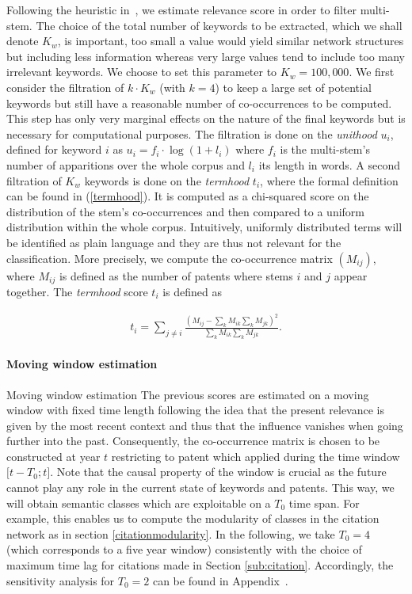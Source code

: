 Following the heuristic in~\cite{chavalarias2013phylomemetic}, we estimate relevance score in order to filter multi-stem. The choice of the total number of keywords to be extracted, which we shall denote $K_w$, is important, too small a value would yield similar network structures but including less information whereas very large values tend to include too many irrelevant keywords. We choose to set this parameter to $K_w = 100,000$. We first consider the filtration of $k\cdot K_w$ (with $k=4$) to keep a large set of potential keywords but still have a reasonable number of co-occurrences to be computed. This step has only very marginal effects on the nature of the final keywords but is necessary for computational purposes. The filtration is done on the \emph{unithood} $u_i$, defined for keyword $i$ as $u_i = f_i\cdot \log{(1 + l_i)}$ where $f_i$ is the multi-stem's number of apparitions over the whole corpus and $l_i$ its length in words. A second filtration of $K_w$ keywords is done on the \emph{termhood} $t_i$, where the formal definition can be found in (\ref{termhood}). It is computed as a chi-squared score on the distribution of the stem's co-occurrences and then compared to a uniform distribution within the whole corpus. Intuitively, uniformly distributed terms will be identified as plain language and they are thus not relevant for the classification. More precisely, we compute the co-occurrence matrix $(M_{ij})$, where $M_{ij}$ is defined as the number of patents where stems $i$ and $j$ appear together. The \emph{termhood} score $t_i$ is defined as

\begin{eqnarray}
\label{termhood}
t_i = \sum_{j\neq i}\frac{\left( M_{ij} - \sum_{k}M_{ik} \sum_{k} M_{jk}\right)^2}{\sum_{k}M_{ik} \sum_{k} M_{jk}}.
\end{eqnarray}

\paragraph{Moving window estimation}{Moving window estimation}
The previous scores are estimated on a moving window with fixed time length following the idea that the present relevance is given by the most recent context and thus that the influence vanishes when going further into the past. Consequently, the co-occurrence matrix is chosen to be constructed at year $t$ restricting to patent which applied during the time window $\big[ t - T_0 ; t \big]$. Note that the causal property of the window is crucial as the future cannot play any role in the current state of keywords and patents. This way, we will obtain semantic classes which are exploitable on a $T_0$ time span. For example, this enables us to compute the modularity of classes in the citation network as in section \ref{citationmodularity}. In the following, we take $T_0 = 4$ (which corresponds to a five year window) consistently with the choice of maximum time lag for citations made in Section \ref{sub:citation}. Accordingly, the sensitivity analysis for $T_0=2$ can be found in Appendix~.

